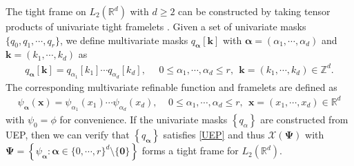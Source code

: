 \documentclass[reqno]{siamonline1116}
\numberwithin{theorem}{section}
\numberwithin{equation}{section}
\def\R{{\mathbb R}}
\def\Z{{\mathbb Z}}
\def\f{\frac}
\def\bk{{\boldsymbol k}}
\def\x{\boldsymbol{x}}
\def\msX{{\mathscr X}}
\def\aal{\boldsymbol{\alpha}}
\def\0{{\mathbf 0}}
\def\Ps{{\boldsymbol \Psi}}
\begin{document}

The tight frame on $L_2(\R^d)$ with $d\geq 2$ can be constructed by taking tensor products of univariate tight framelets \cite{J.F.Cai2012,J.F.Cai2016,Daubechies1992,B.Dong2013}. Given a set of univariate masks $\big\{q_0,q_1,\cdots,q_r\big\}$, we define multivariate masks $q_{\aal}[\bk]$ with $\aal=(\alpha_1,\cdots,\alpha_d)$ and $\bk=(k_1,\cdots,k_d)$ as
\begin{align*}
q_{\aal}[\bk]=q_{\alpha_1}[k_1]\cdots q_{\alpha_d}[k_d],~~~~~~0\leq\alpha_1,\cdots,\alpha_d\leq r,~~\bk=(k_1,\cdots,k_d)\in\Z^d.
\end{align*}
The corresponding multivariate refinable function and framelets are defined as
\begin{align*}
\psi_{\aal}(\x)=\psi_{\alpha_1}(x_1)\cdots\psi_{\alpha_d}(x_d),~~~~~0\leq\alpha_1,\cdots,\alpha_d\leq r,~~\x=(x_1,\cdots,x_d)\in\R^d
\end{align*}
with $\psi_0=\phi$ for convenience. If the univariate masks $\left\{q_{\alpha}\right\}$ are constructed from UEP, then we can verify that $\left\{q_{\aal}\right\}$ satisfies \cref{UEP} and thus $\msX(\Ps)$ with $\Ps=\left\{\psi_{\aal}:\aal\in\{0,\cdots,r\}^d\setminus\{\0\}\right\}$ forms a tight frame for $L_2(\R^d)$.
\end{document}
